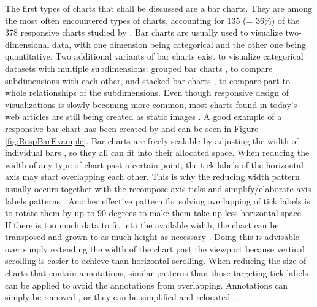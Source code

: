 The first types of charts that shall be discussed are a bar charts. They are among the most often encountered types of charts, accounting for 135 (= 36\%) of the 378 responsive charts studied by \cite{DesignPatternsTradeOffsRespVis}. Bar charts are usually used to visualize two-dimensional data, with one dimension being categorical and the other one being quantitative. Two additional variants of bar charts exist to visualize categorical datasets with multiple subdimensions: grouped bar charts \parencite{GroupedBar}, to compare subdimensions with each other, and stacked bar charts \parencite{StackedBar}, to compare part-to-whole relationships of the subdimensions. Even though responsive design of visualizations is slowly becoming more common, most charts found in today's web articles are still being created as static images \parencite{HBar,VBar,HVBar,MapBarLine}. A good example of a responsive bar chart has been created by \cite{RespVis} and can be seen in Figure \ref{fig:RespBarExample}. Bar charts are freely scalable by adjusting the width of individual bars \parencite{RespHBar,RespHBarHLine,RespHBars}, so they all can fit into their allocated space. When reducing the width of any type of chart past a certain point, the tick labels of the horizontal axis may start overlapping each other. This is why the reducing width pattern usually occurs together with the recompose axis ticks and simplify/elaborate axis labels patterns \parencite{RespHBars,RespHBarHLine,RespVBar}. Another effective pattern for solving overlapping of tick labels is to rotate them by up to 90 degrees to make them take up less horizontal space \parencite{RespVis}. If there is too much data to fit into the available width, the chart can be transposed and grown to as much height as necessary \parencite{RespVis}. Doing this is advisable over simply extending the width of the chart past the viewport because vertical scrolling is easier to achieve than horizontal scrolling. When reducing the size of charts that contain annotations, similar patterns than those targeting tick labels can be applied to avoid the annotations from overlapping. Annotations can simply be removed \parencite{RespHStackedBar,RespHLineHStackedBar}, or they can be simplified and relocated \parencite{RespVBar}.

